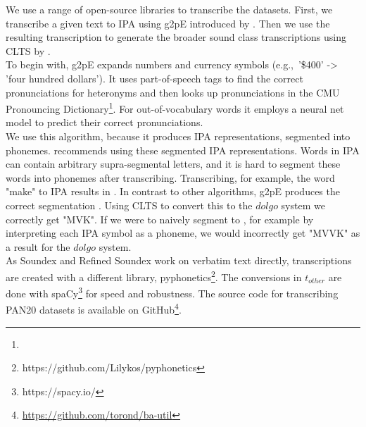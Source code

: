 We use a range of open-source libraries to transcribe the datasets.
First, we transcribe a given text to IPA using g2pE introduced by \cite{kyubyong2019g2pE}.
Then we use the resulting transcription to generate the broader sound class transcriptions using CLTS by \cite{list2018cltsIntro}.\\
To begin with, g2pE expands numbers and currency symbols (e.g.,\ '\$400' -> 'four hundred dollars').
It uses part-of-speech tags to find the correct pronunciations for heteronyms and then looks up pronunciations in the CMU Pronouncing Dictionary\footnote{}.
For out-of-vocabulary words it employs a neural net model to predict their correct pronunciations.\\
We use this algorithm, because it produces IPA representations, segmented into phonemes.
\cite{list2018sequence} recommends using these segmented IPA representations.
Words in IPA can contain arbitrary supra-segmental letters, and it is hard to segment these words into phonemes after transcribing.
Transcribing, for example, the word "make" to IPA results in \textipa{[meIk]}.
In contrast to other algorithms, g2pE produces the correct segmentation \textipa{[m eI k]}.
Using CLTS to convert this to the $dolgo$ system we correctly get "MVK".
If we were to naively segment \textipa{[meIk]} to \textipa{[m e I k]}, for example by interpreting each IPA symbol as a phoneme, we would incorrectly get "MVVK" as a result for the $dolgo$ system.\\
As Soundex and Refined Soundex work on verbatim text directly, transcriptions are created with a different library, pyphonetics\footnote{https://github.com/Lilykos/pyphonetics}.
The conversions in $t_{other}$ are done with spaCy\footnote{https://spacy.io/} for speed and robustness.
The source code for transcribing PAN20 datasets is available on GitHub\footnote{\url{https://github.com/torond/ba-util}}.


